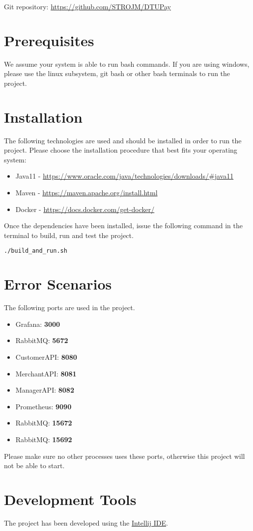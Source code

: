 \documentclass[12pt]{article}
\newcommand{\port}[1]{\textbf{#1}}
\begin{document}
Git repository: \url{https://github.com/STROJM/DTUPay}
\section{Prerequisites}
We assume your system is able to run bash commands. If you are using windows, please use the linux subsystem, git bash or other bash terminals to run the project.


\section{Installation}
The following technologies are used and should be installed in order to run the project. Please choose the installation procedure that best fits your operating system:

\begin{itemize}
	\item{Java11 - \url{https://www.oracle.com/java/technologies/downloads/#java11}}
	\item{Maven - \url{https://maven.apache.org/install.html}}
	\item{Docker - \url{https://docs.docker.com/get-docker/}}
\end{itemize}

Once the dependencies have been installed, issue the following command in the terminal to build, run and test the project.

\begin{lstlisting}
./build_and_run.sh
\end{lstlisting}


\section{Error Scenarios}
The following ports are used in the project.
\begin{itemize}
	\item{Grafana: \port{3000}}
	\item{RabbitMQ: \port{5672}}
	\item{CustomerAPI: \port{8080}}
	\item{MerchantAPI: \port{8081}}
	\item{ManagerAPI: \port{8082}}
	\item{Prometheus: \port{9090}}
	\item{RabbitMQ: \port{15672}}
	\item{RabbitMQ: \port{15692}}
\end{itemize}

Please make sure no other processes uses these ports, otherwise this project will not be able to start.

\section{Development Tools}
The project has been developed using the \href{https://www.jetbrains.com/idea/}{Intellij IDE}.
\end{document}
